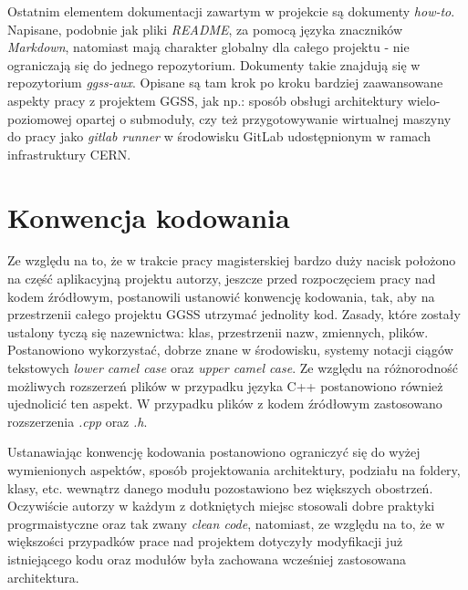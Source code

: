 Ostatnim elementem dokumentacji zawartym w projekcie są dokumenty \emph{how-to}. Napisane, podobnie jak pliki \emph{README}, za pomocą języka znaczników \emph{Markdown}, natomiast mają charakter globalny dla całego projektu - nie ograniczają się do jednego repozytorium. Dokumenty takie znajdują się w repozytorium \emph{ggss-aux}. Opisane są tam krok po kroku bardziej zaawansowane aspekty pracy z projektem GGSS, jak np.: sposób obsługi architektury wielo-poziomowej opartej o submoduły, czy też przygotowywanie wirtualnej maszyny do pracy jako \emph{gitlab runner} w środowisku GitLab udostępnionym w ramach infrastruktury CERN.

\section{Konwencja kodowania}


Ze względu na to, że w trakcie pracy magisterskiej bardzo duży nacisk położono na część aplikacyjną projektu autorzy, jeszcze przed rozpoczęciem pracy nad kodem źródłowym, postanowili ustanowić konwencję kodowania, tak, aby na przestrzenii całego projektu GGSS utrzymać jednolity kod. Zasady, które zostały ustalony tyczą się nazewnictwa: klas, przestrzenii nazw, zmiennych, plików. Postanowiono wykorzystać, dobrze znane w środowisku, systemy notacji ciągów tekstowych \emph{lower camel case} oraz \emph{upper camel case}. Ze względu na różnorodność możliwych rozszerzeń plików w przypadku języka C++ postanowiono również ujednolicić ten aspekt. W przypadku plików z kodem źródłowym zastosowano rozszerzenia \emph{.cpp} oraz \emph{.h}. %

Ustanawiając konwencję kodowania postanowiono ograniczyć się do wyżej wymienionych aspektów, sposób projektowania architektury, podziału na foldery, klasy, etc. wewnątrz danego modułu pozostawiono bez większych obostrzeń. Oczywiście autorzy w każdym z dotkniętych miejsc stosowali dobre praktyki progrmaistyczne oraz tak zwany \emph{clean code}, natomiast, ze względu na to, że w większości przypadków prace nad projektem dotyczyły modyfikacji już istniejącego kodu oraz modułów była zachowana wcześniej zastosowana architektura.

